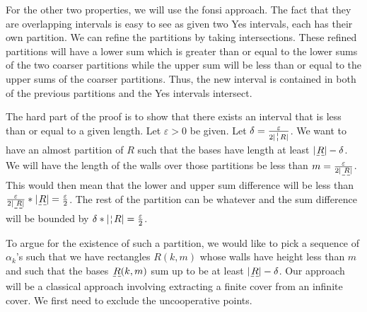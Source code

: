\documentclass[12pt]{article}
\theoremstyle{remark}
\begin{document}
For the other two properties, we will use the fonsi approach. The fact that they are overlapping intervals is easy to see as given two Yes intervals, each has their own partition. We can refine the partitions by taking intersections. These refined partitions will have a lower sum which is greater than or equal to the lower sums of the two coarser partitions while the upper sum will be less than or equal to the upper sums of the coarser partitions. Thus, the new interval is contained in both of the previous partitions and the Yes intervals intersect. 

The hard part of the proof is to show that there exists an interval that is less than or equal to a given length. Let $\varepsilon > 0$ be given. Let $\delta = \frac{\varepsilon}{2|\wall{R}|}$. We want to have an almost partition of $R$ such that the bases have length at least $|\base{R}| - \delta$. We will have the length of the walls over those partitions be less than $m = \frac{\varepsilon}{2|\base{R}|}$. This would then mean that the lower and upper sum difference will be less than $\frac{\varepsilon}{2|\base{R}|} * |\base{R}| = \frac{\varepsilon}{2}$. The rest of the partition can be whatever and the sum difference will be bounded by $\delta * |\wall{R}| = \frac{\varepsilon}{2}$.

To argue for the existence of such a partition, we would like to pick a sequence of $\alpha_k$'s such that we have rectangles $R(k, m)$  whose walls have height less than $m$ and such that the bases $\base{R} (k, m)$ sum up to be at least $|\base{R}|-\delta$. Our approach will be a classical approach involving extracting a finite cover from an infinite cover. We first need to exclude the uncooperative points. 
\end{document}
